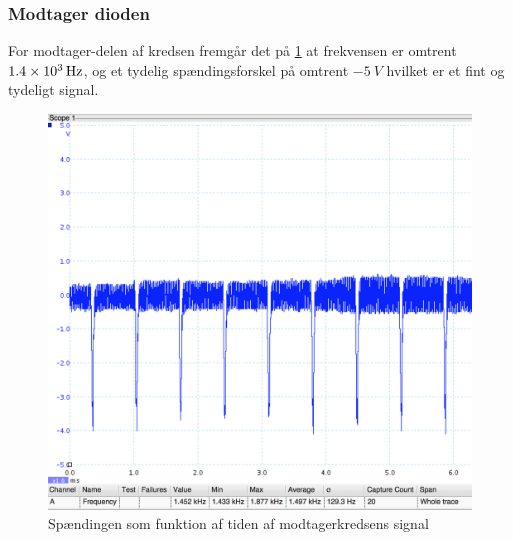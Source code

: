 \subsubsection{Modtager dioden}
For modtager-delen af kredsen fremgår det på \ref{fig:IR_modtager} at frekvensen er omtrent $\SI{1.4d3}{Hz}$, og et tydelig spændingsforskel på omtrent $-\SI{5}{V}$ hvilket er et fint og tydeligt signal.
\begin{figure}[H]
	\centering
    \includegraphics[width=13cm]{figures/2_4_3hastighed/IR_modtager.png}
	\caption{Spændingen som funktion af tiden af modtagerkredsens signal}
	\label{fig:IR_modtager}
\end{figure}

















